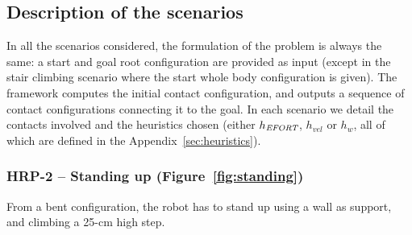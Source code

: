 \documentclass[journal]{IEEEtran}
\newcommand{\gls}[1]{\textit{#1}}
\begin{document}


\subsection{Description of the scenarios}
In all the scenarios considered, the formulation of the problem is always the same:
a start and goal root configuration are provided as input (except in the stair climbing scenario where the start whole body configuration is given).
The framework computes the initial contact configuration, and outputs a sequence of contact configurations connecting it to the goal.
In each scenario we detail the contacts involved and the heuristics chosen (either $h_{\textrm{\it EFORT}}$, $h_{vel}$ or $h_{w}$, all of which are defined in the Appendix~\ref{sec:heuristics}).



\subsubsection{HRP-2 -- Standing up (Figure~\ref{fig:standing})}
From a bent configuration, the robot has to stand up using a wall as support, and climbing a 25-cm high step.
\end{document}

